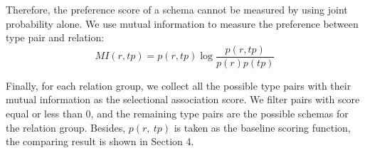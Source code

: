 

Therefore, the preference score of a schema cannot be measured by using joint probability alone.
We use mutual information to measure the preference between type pair and relation:
\begin{equation}
MI(r, tp) = p(r, tp) \log \frac {p(r, tp)}{p(r) p(tp)}
\end{equation}


Finally, for each relation group, we collect all the possible type pairs with
their mutual information as the selectional association score.
We filter pairs with score equal or less than 0, and the remaining type pairs
are the possible schemas for the relation group.
Besides, $p(r,\ tp)$ is taken as the baseline scoring function, the comparing result is shown
in Section 4.

